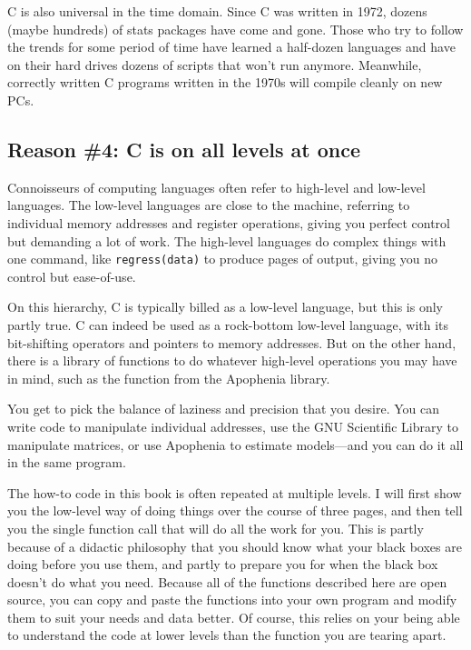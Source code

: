 C is also universal in the time domain. 
Since C was written in 1972, dozens (maybe hundreds)
of stats packages have come and gone. Those who try to follow the trends
for some period of time have learned a half-dozen languages and have on
their hard drives dozens of scripts that won't run anymore.  Meanwhile,
correctly written C programs written in the 1970s will compile cleanly
on new PCs.


\ifbook
\subsection{Reason \#4: C is on all levels at once} 
Connoisseurs of computing languages often refer to high-level and low-level languages. The low-level
languages are close to the machine, referring to individual memory
addresses and register operations, giving you perfect control but demanding a lot
of work. The high-level languages do
complex things with one command, like {\tt regress(data)} to produce
pages of output, giving you no control but ease-of-use.

On this hierarchy, C is typically billed as a low-level language, but this is only
partly true. C can indeed be used as a rock-bottom low-level language,
with its bit-shifting operators and pointers to memory addresses.
But on the other hand, there is a library of functions
to do whatever high-level operations you may have in mind, such as the
 function from the Apophenia library.

You get to pick the balance of laziness and precision that you desire. You
can write code to manipulate individual addresses, use the GNU Scientific
Library to manipulate matrices, or use Apophenia to estimate models---and
you can do it all in the same program.

The how-to code in this book is often repeated at multiple levels. I will first
show you the low-level way of doing things over the course of three
pages, and then tell you the single function call that will do all the work
for you. This is partly because of a didactic philosophy that you should
know what your black boxes are doing before you use them, and partly
to prepare you for when the black box doesn't do what you need. Because all of the
functions described here are open source, you can copy and paste the
functions into your own program and modify them to suit your needs
and data better. Of course, this relies on your being able to understand
the code at lower levels than the function you are tearing apart.
\fi
